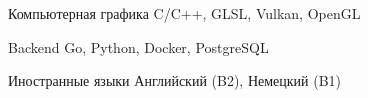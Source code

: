 

\begin{cvskills}

  \cvskill
    {Компьютерная графика} %
    {C/C++, GLSL, Vulkan, OpenGL} %

  \cvskill
    {Backend} %
    {Go, Python, Docker, PostgreSQL} %

  \cvskill
    {Иностранные языки} %
    {Английский (B2), Немецкий (B1)} %

\end{cvskills}
